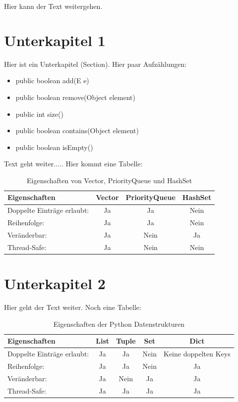 \documentclass[fontsize=12pt,paper=a4,open=any,parskip=half,
  twoside=false,toc=listof,toc=bibliography,fleqn,leqno,
  captions=nooneline,captions=tableabove,british]{scrbook}
\begin{document}
Hier kann der Text weitergehen.


\section{Unterkapitel 1}\label{sec:c.f}
Hier ist ein Unterkapitel (Section). Hier paar Aufzählungen:

\begin{itemize}
 \item public boolean add(E e) 
 \item public boolean remove(Object element)
 \item public int size()
 \item public boolean contains(Object element)
 \item public boolean isEmpty()
\end{itemize}

Text geht weiter..... Hier kommt eine Tabelle:

\begin{table}[htbp]
\caption{Eigenschaften von Vector, PriorityQueue und HashSet}
\label{data-table}
\centering
  \begin{tabular}{l  c  c  c} 
\toprule
    Eigenschaften & Vector & PriorityQueue & HashSet\\ 
\midrule  
    Doppelte Einträge erlaubt:   		& Ja  	&  Ja  	& Nein \\
    Reihenfolge:   						& Ja 	&  Ja 		& Nein \\ 
	Veränderbar:   						& Ja	&  Nein 	& Ja \\ 
	Thread-Safe:   						& Ja 	& Nein 	& Nein\\ 
  \end{tabular}

\end{table}


\section{Unterkapitel 2}\label{ch:vector}
Hier geht der Text weiter. Noch eine Tabelle:

\begin{table}[htbp]
\caption{Eigenschaften der Python Datenstrukturen \autocite{listuple}}
\label{python-data-table}
\centering
  \begin{tabular}{l  c  c  c c} 
\toprule
    Eigenschaften & List & Tuple & Set & Dict\\ 
\midrule  
    	Doppelte Einträge erlaubt:   			& Ja  	&  Ja  		& Nein 	& Keine doppelten Keys\\
    	Reihenfolge:   						& Ja 	&  Ja 		& Nein 	& Ja\\ 
	Veränderbar:   						& Ja	&  Nein 	& Ja 		& Ja\\ 
	Thread-Safe:   						& Ja 	& Ja 	& Ja 		& Ja\\ 
  \end{tabular}

\end{table}





\printbibliography[title=Literaturverzeichnis]
\end{document}

